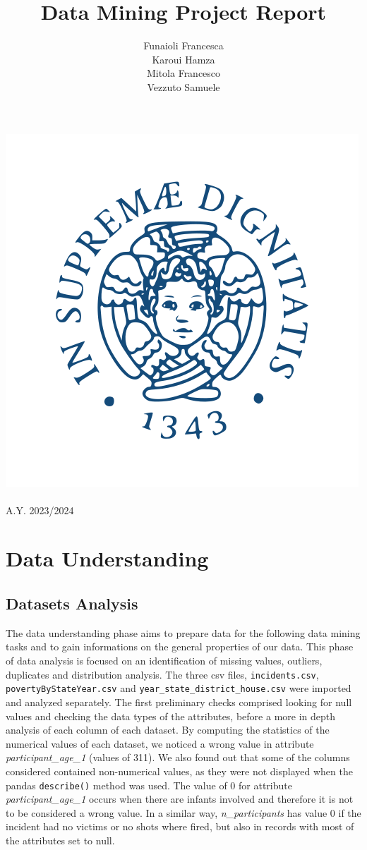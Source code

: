 \documentclass[10pt,a4paper]{report}
\title{\huge{\textbf{Data Mining Project Report}}}
\author{Funaioli Francesca\\
Karoui Hamza\\
Mitola Francesco\\
Vezzuto Samuele\\
}
\begin{document}
\makeatletter
\begin{titlepage}
	\begin{center}
		\includegraphics[width=0.4\linewidth]{unipi}\\[4ex]
		{\huge \bfseries  \@title }\\[2ex]
		{\Large A.Y. 2023/2024 }\\[6ex]
		{\large  \@author}
	\end{center}
\end{titlepage}
\makeatother

\tableofcontents
\thispagestyle{empty}
\clearpage
{}
\chapter{Data Understanding}

\section{Datasets Analysis}

The data understanding phase aims to prepare data for the following data mining tasks and to gain informations on the general properties of our data.
This phase of data analysis is focused on an identification of missing values, outliers, duplicates and distribution analysis.
The three csv files, \texttt{incidents.csv}, \texttt{povertyByStateYear.csv} and \texttt{year\_state\_district\_house.csv} were imported and analyzed separately.
The first preliminary checks comprised looking for null values and checking the data types of the attributes, before a more in depth analysis of each column of each dataset.
By computing the statistics of the numerical values of each dataset, we noticed a wrong value in attribute \textit{participant\_age\_1} (values of 311).
We also found out that some of the columns considered contained non-numerical values, as they were not displayed when the pandas \texttt{describe()} method was used.
The value of 0 for attribute \textit{participant\_age\_1} occurs when there are infants involved and therefore it is not to be considered a wrong value.
In a similar way, \textit{n\_participants} has value 0 if the incident had no victims or no shots where fired, but also in records with most of the attributes set to null.
\end{document}
